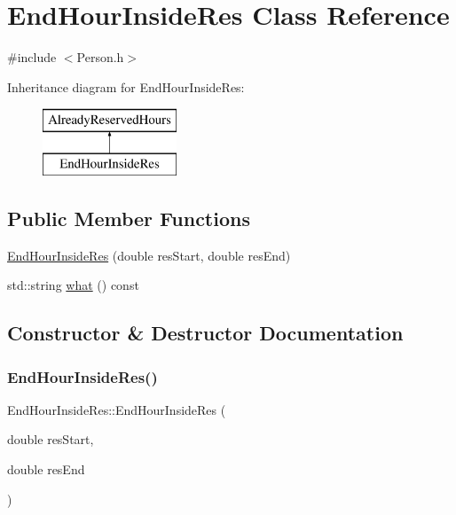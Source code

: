 \hypertarget{class_end_hour_inside_res}{}\section{End\+Hour\+Inside\+Res Class Reference}
\label{class_end_hour_inside_res}


{\ttfamily \#include $<$Person.\+h$>$}

Inheritance diagram for End\+Hour\+Inside\+Res\+:\begin{figure}[H]
\begin{center}
\leavevmode
\includegraphics[height=2.000000cm]{class_end_hour_inside_res}
\end{center}
\end{figure}
\subsection*{Public Member Functions}
\begin{DoxyCompactItemize}
\item 
\mbox{\hyperlink{class_end_hour_inside_res_af2162a2e870bf25d64f773089def5ec2}{End\+Hour\+Inside\+Res}} (double res\+Start, double res\+End)
\item 
std\+::string \mbox{\hyperlink{class_end_hour_inside_res_afee9514b15c167847bc55ebe833076ff}{what}} () const
\end{DoxyCompactItemize}


\subsection{Constructor \& Destructor Documentation}
\mbox{\label{class_end_hour_inside_res_af2162a2e870bf25d64f773089def5ec2}} 
\subsubsection{\texorpdfstring{End\+Hour\+Inside\+Res()}{EndHourInsideRes()}}
{\footnotesize\ttfamily End\+Hour\+Inside\+Res\+::\+End\+Hour\+Inside\+Res (\begin{DoxyParamCaption}\item[{double}]{res\+Start,  }\item[{double}]{res\+End }\end{DoxyParamCaption})\hspace{0.3cm}{\ttfamily [inline]}}



